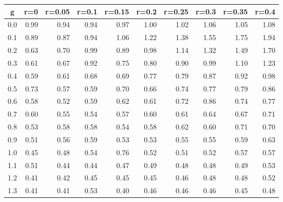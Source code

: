 %
\begin{table}[!tbp]
 \begin{center}
 \begin{tabular}{rrrrrrrrrr}\hline\hline
\multicolumn{1}{c}{g}&\multicolumn{1}{c}{r=0}&\multicolumn{1}{c}{r=0.05}&\multicolumn{1}{c}{r=0.1}&\multicolumn{1}{c}{r=0.15}&\multicolumn{1}{c}{r=0.2}&\multicolumn{1}{c}{r=0.25}&\multicolumn{1}{c}{r=0.3}&\multicolumn{1}{c}{r=0.35}&\multicolumn{1}{c}{r=0.4}\tabularnewline
\hline
0.0&0.99&0.94&0.94&0.97&1.00&1.02&1.06&1.05&1.08\tabularnewline
0.1&0.89&0.87&0.94&1.06&1.22&1.38&1.55&1.75&1.94\tabularnewline
0.2&0.63&0.70&0.99&0.89&0.98&1.14&1.32&1.49&1.70\tabularnewline
0.3&0.61&0.67&0.92&0.75&0.80&0.90&0.99&1.10&1.23\tabularnewline
0.4&0.59&0.61&0.68&0.69&0.77&0.79&0.87&0.92&0.98\tabularnewline
0.5&0.73&0.57&0.59&0.70&0.66&0.74&0.77&0.79&0.86\tabularnewline
0.6&0.58&0.52&0.59&0.62&0.61&0.72&0.86&0.74&0.77\tabularnewline
0.7&0.60&0.55&0.54&0.57&0.60&0.61&0.64&0.67&0.71\tabularnewline
0.8&0.53&0.58&0.58&0.54&0.58&0.62&0.60&0.71&0.70\tabularnewline
0.9&0.51&0.56&0.59&0.53&0.53&0.55&0.55&0.59&0.63\tabularnewline
1.0&0.45&0.48&0.54&0.76&0.52&0.51&0.52&0.57&0.57\tabularnewline
1.1&0.51&0.44&0.44&0.47&0.49&0.48&0.48&0.49&0.53\tabularnewline
1.2&0.41&0.42&0.45&0.45&0.45&0.46&0.48&0.48&0.52\tabularnewline
1.3&0.41&0.41&0.53&0.40&0.46&0.46&0.46&0.45&0.48\tabularnewline
\hline
\end{tabular}

\end{center}

\end{table}

